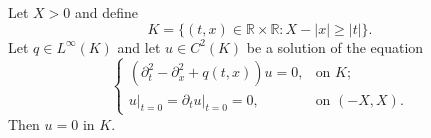 \documentclass[12pt,oneside,final]{amsart}
\newcommand{\HOX}[1]{\todo[noline,color=white,size=\footnotesize]{#1}}
\begin{document}
\begin{theorem}\label{th_fsp_1d}
	Let $X>0$ and define
	\begin{equation*}
		K = \{(t,x)\in \mathbb{R}\times\mathbb{R}: X- |x|\geq |t|\}.
	\end{equation*}
Let $q \in L^\infty(K)$ and let $u \in C^2(K)$ be a solution of the equation
	\begin{equation*}
		\begin{cases}
			\left(\partial_t^2 - \partial_x^2 + q(t,x)\right) u = 0, & \text{on } K;\\
			\left.u\right|_{t=0} = \left.\partial_t u\right|_{t=0} = 0, & \text{on } (-X,X).
		\end{cases}
	\end{equation*}
Then $u = 0$ in $K$.
\end{theorem}
\end{document}
